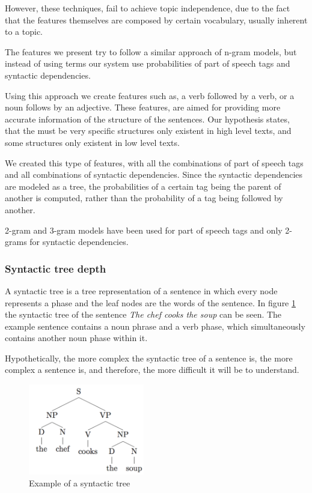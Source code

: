\documentclass{acm_proc_article-sp}
\begin{document}
However, these techniques, fail to achieve topic independence, due to the fact that the features themselves are composed by certain vocabulary, usually inherent to a topic.

The features we present try to follow a similar approach of n-gram models, but instead of using terms our system use probabilities of part of speech tags and syntactic dependencies.

Using this approach we create features such as, a verb followed by a verb, or a noun follows by an adjective. These features, are aimed for providing more accurate information of the structure of the sentences. Our hypothesis states, that the must be very specific structures only existent in high level texts, and some structures only existent in low level texts.

We created this type of features, with all the combinations of part of speech tags and all combinations of syntactic dependencies. Since the syntactic dependencies are modeled as a tree, the probabilities of a certain tag being the parent of another is computed, rather than the probability of a tag being followed by another. 

2-gram and 3-gram models have been used for part of speech tags and only 2-grams for syntactic dependencies.


\subsubsection{Syntactic tree depth}

A syntactic tree is a tree representation of a sentence in which every node represents a phase and the leaf nodes are the words of the sentence. In figure \ref{syntactictree} the syntactic tree of the sentence \emph{The chef cooks the soup} can be seen. The example sentence contains a noun phrase and a verb phase, which simultaneously contains another noun phase within it.

Hypothetically, the more complex the syntactic tree of a sentence is, the more complex a sentence is, and therefore, the more difficult it will be to understand. 
\begin{figure}[h]

\centering
\includegraphics[width=0.45\textwidth]{syntactictree}
\caption{Example of a syntactic tree}
\label{syntactictree}
\end{figure}
\end{document}
